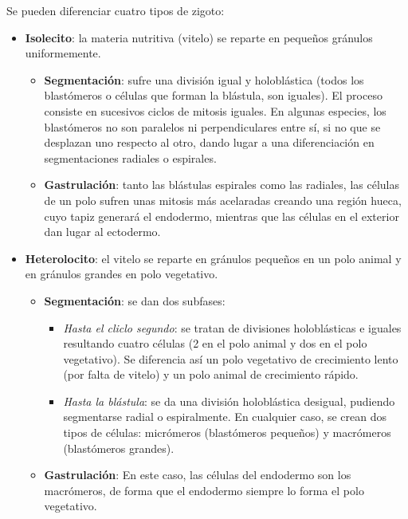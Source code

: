 Se pueden diferenciar cuatro tipos de zigoto:
\begin{itemize}[itemsep=0pt,parsep=0pt,topsep=0pt,partopsep=0pt]
    \item \textbf{Isolecito}: la materia nutritiva (vitelo) se reparte en pequeños gránulos uniformemente.
    \begin{itemize}[itemsep=0pt,parsep=0pt,topsep=0pt,partopsep=0pt]
        \item \textbf{Segmentación}: sufre una división igual y holoblástica (todos los blastómeros o células que forman la blástula, son iguales). El proceso consiste en sucesivos ciclos de mitosis iguales. En algunas especies, los blastómeros no son paralelos ni perpendiculares entre sí, si no que se desplazan uno respecto al otro, dando lugar a una diferenciación en segmentaciones radiales o espirales.
        \item\textbf{Gastrulación}: tanto las blástulas espirales como las radiales, las células de un polo sufren unas mitosis más acelaradas creando una región hueca, cuyo tapiz generará el endodermo, mientras que las células en el exterior dan lugar al ectodermo.
    \end{itemize}
    \item\textbf{Heterolocito}: el vitelo se reparte en gránulos pequeños en un polo animal y en gránulos grandes en polo vegetativo.
    \begin{itemize}[itemsep=0pt,parsep=0pt,topsep=0pt,partopsep=0pt]
        \item \textbf{Segmentación}: se dan dos subfases:
        \begin{itemize}[itemsep=0pt,parsep=0pt,topsep=0pt,partopsep=0pt]
            \item \textit{Hasta el cliclo segundo}: se tratan de divisiones holoblásticas e iguales resultando cuatro células (2 en el polo animal y dos en el polo vegetativo). Se diferencia así un polo vegetativo de crecimiento lento (por falta de vitelo) y un polo animal de crecimiento rápido.
            \item\textit{Hasta la blástula}: se da una división holoblástica desigual, pudiendo segmentarse radial o espiralmente. En cualquier caso, se crean dos tipos de células: micrómeros (blastómeros pequeños) y macrómeros (blastómeros grandes).
        \end{itemize}
        \item\textbf{Gastrulación}: En este caso, las células del endodermo son los macrómeros, de forma que el endodermo siempre lo forma el polo vegetativo.

\end{itemize}
\end{itemize}
